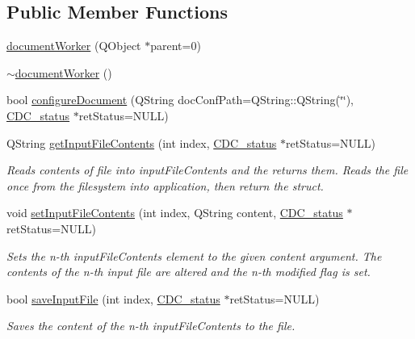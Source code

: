 \subsection*{Public Member Functions}
\begin{DoxyCompactItemize}
\item 
\hyperlink{classdocument_worker_adaab16ea74637a4ebab8eff342aca101}{document\+Worker} (Q\+Object $\ast$parent=0)
\item 
\hyperlink{classdocument_worker_ae51bc4a6da3cd1e769a3690771a4596a}{$\sim$document\+Worker} ()
\item 
bool \hyperlink{classdocument_worker_ab222bea1a23276a9edcce412bf4d524a}{configure\+Document} (Q\+String doc\+Conf\+Path=Q\+String\+::\+Q\+String(\char`\"{}\char`\"{}), \hyperlink{cdcdefs_8h_a7a1ca742b5a041762c1b5784532bd7fd}{C\+D\+C\+\_\+status} $\ast$ret\+Status=N\+U\+L\+L)
\item 
Q\+String \hyperlink{classdocument_worker_aefcc1bfe56d564865818ded4b258c20e}{get\+Input\+File\+Contents} (int index, \hyperlink{cdcdefs_8h_a7a1ca742b5a041762c1b5784532bd7fd}{C\+D\+C\+\_\+status} $\ast$ret\+Status=N\+U\+L\+L)
\begin{DoxyCompactList}\small\item\em Reads contents of file into input\+File\+Contents and the returns them. Reads the file once from the filesystem into application, then return the struct. \end{DoxyCompactList}\item 
void \hyperlink{classdocument_worker_a255b9a45fb833eb41b37461928bf5c4e}{set\+Input\+File\+Contents} (int index, Q\+String content, \hyperlink{cdcdefs_8h_a7a1ca742b5a041762c1b5784532bd7fd}{C\+D\+C\+\_\+status} $\ast$ret\+Status=N\+U\+L\+L)
\begin{DoxyCompactList}\small\item\em Sets the n-\/th input\+File\+Contents element to the given {\itshape content} argument. The contents of the n-\/th input file are altered and the n-\/th {\itshape modified} flag is set. \end{DoxyCompactList}\item 
bool \hyperlink{classdocument_worker_a58ac3a2179ce52dde55b19cf458a7aae}{save\+Input\+File} (int index, \hyperlink{cdcdefs_8h_a7a1ca742b5a041762c1b5784532bd7fd}{C\+D\+C\+\_\+status} $\ast$ret\+Status=N\+U\+L\+L)
\begin{DoxyCompactList}\small\item\em Saves the content of the n-\/th input\+File\+Contents to the file. \end{DoxyCompactList}\item 

\end{DoxyCompactItemize}
